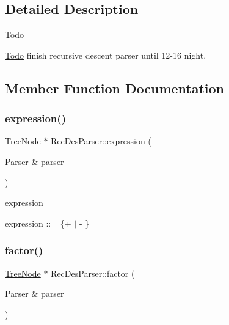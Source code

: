 \subsection{Detailed Description}
\begin{DoxyRefDesc}{Todo}
\item[\hyperlink{todo__todo000006}{Todo}]finish recursive descent parser until 12-\/16 night. \end{DoxyRefDesc}


\subsection{Member Function Documentation}
\hypertarget{class_rec_des_parser_a0640caa2edc21da4f7509a2a04c1c132}{}\label{class_rec_des_parser_a0640caa2edc21da4f7509a2a04c1c132} 
\subsubsection{\texorpdfstring{expression()}{expression()}}
{\footnotesize\ttfamily \hyperlink{class_tree_node}{Tree\+Node} $\ast$ Rec\+Des\+Parser\+::expression (\begin{DoxyParamCaption}\item[{\hyperlink{class_parser}{Parser} \&}]{parser }\end{DoxyParamCaption})\hspace{0.3cm}{\ttfamily [static]}}



expression 

expression \+:\+:=  \{+  $\vert$ -\/ \} \hypertarget{class_rec_des_parser_ae31030c069102efd0d77aa7c187a142d}{}\label{class_rec_des_parser_ae31030c069102efd0d77aa7c187a142d} 
\subsubsection{\texorpdfstring{factor()}{factor()}}
{\footnotesize\ttfamily \hyperlink{class_tree_node}{Tree\+Node} $\ast$ Rec\+Des\+Parser\+::factor (\begin{DoxyParamCaption}\item[{\hyperlink{class_parser}{Parser} \&}]{parser }\end{DoxyParamCaption})\hspace{0.3cm}{\ttfamily [static]}}



